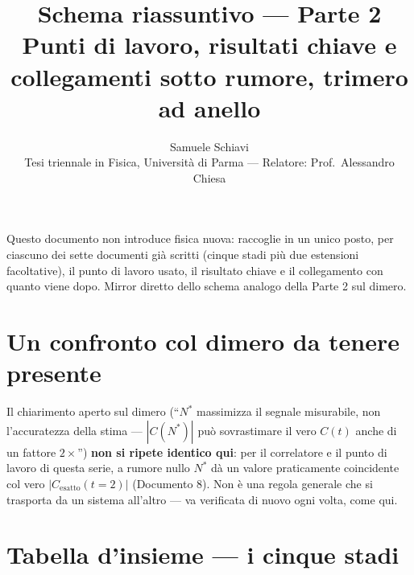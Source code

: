 \documentclass[11pt,a4paper]{article}
\title{\bfseries Schema riassuntivo --- Parte 2\\[2pt]
\large Punti di lavoro, risultati chiave e collegamenti sotto rumore, trimero ad anello}
\author{Samuele Schiavi \\ \small Tesi triennale in Fisica, Università di Parma
--- Relatore: Prof.\ Alessandro Chiesa}
\date{}
\begin{document}
\maketitle
\thispagestyle{fancy}

Questo documento non introduce fisica nuova: raccoglie in un unico posto,
per ciascuno dei sette documenti già scritti (cinque stadi più due
estensioni facoltative), il punto di lavoro usato, il risultato chiave e
il collegamento con quanto viene dopo. Mirror diretto dello schema
analogo della Parte 2 sul dimero.

\section*{Un confronto col dimero da tenere presente}

Il chiarimento aperto sul dimero (``$N^*$ massimizza il segnale
misurabile, non l'accuratezza della stima --- $|C(N^*)|$ può sovrastimare
il vero $C(t)$ anche di un fattore $2\times$'') \textbf{non si ripete
identico qui}: per il correlatore e il punto di lavoro di questa serie, a
rumore nullo $N^*$ dà un valore praticamente coincidente col vero
$|C_\text{esatto}(t{=}2)|$ (Documento 8). Non è una regola generale che si
trasporta da un sistema all'altro --- va verificata di nuovo ogni volta,
come qui.

\section{Tabella d'insieme --- i cinque stadi}
\end{document}
